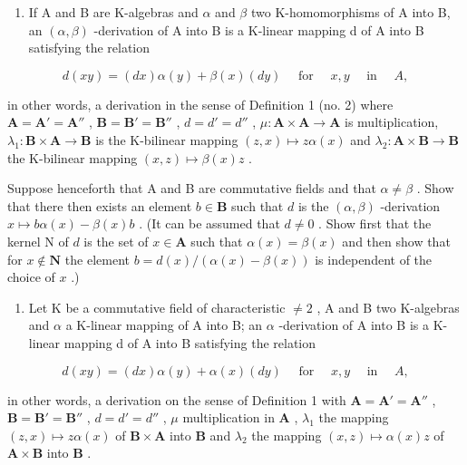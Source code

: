 \BourbakiExercisesSection

\begin{enumerate}
\def\labelenumi{\arabic{enumi}.}
\tightlist
\item
  If A and B are K-algebras and \(\alpha\) and \(\beta\) two K-homomorphisms of A into B, an \((\alpha, \beta)\) -derivation of A into B is a K-linear mapping d of A into B satisfying the relation
\end{enumerate}

\[
d (x y) = (d x) \alpha (y) + \beta (x) (d y) \quad \text { for } \quad x, y \quad \text { in } \quad A,
\]

in other words, a derivation in the sense of Definition 1 (no. 2) where \(\mathbf{A} = \mathbf{A}' = \mathbf{A}''\) , \(\mathbf{B} = \mathbf{B}' = \mathbf{B}''\) , \(d = d' = d''\) , \(\mu: \mathbf{A} \times \mathbf{A} \to \mathbf{A}\) is multiplication, \(\lambda_1: \mathbf{B} \times \mathbf{A} \to \mathbf{B}\) is the K-bilinear mapping \((z, x) \mapsto z\alpha(x)\) and \(\lambda_2: \mathbf{A} \times \mathbf{B} \to \mathbf{B}\) the K-bilinear mapping \((x, z) \mapsto \beta(x)z\) .

Suppose henceforth that A and B are commutative fields and that \(\alpha \neq \beta\) . Show that there then exists an element \(b \in \mathbf{B}\) such that \(d\) is the \((\alpha, \beta)\) -derivation \(x \mapsto b\alpha(x) - \beta(x)b\) . (It can be assumed that \(d \neq 0\) . Show first that the kernel N of \(d\) is the set of \(x \in \mathbf{A}\) such that \(\alpha(x) = \beta(x)\) and then show that for \(x \notin \mathbf{N}\) the element \(b = d(x)/( \alpha(x) - \beta(x))\) is independent of the choice of \(x\) .)

\begin{enumerate}
\def\labelenumi{\arabic{enumi}.}
\setcounter{enumi}{1}
\tightlist
\item
  Let K be a commutative field of characteristic \(\neq2\) , A and B two K-algebras and \(\alpha\) a K-linear mapping of A into B; an \(\alpha\) -derivation of A into B is a K-linear mapping d of A into B satisfying the relation
\end{enumerate}

\[
d (x y) = (d x) \alpha (y) + \alpha (x) (d y) \quad \text { for } \quad x, y \quad \text { in } \quad A,
\]

in other words, a derivation on the sense of Definition 1 with \(\mathbf{A} = \mathbf{A}' = \mathbf{A}''\) , \(\mathbf{B} = \mathbf{B}' = \mathbf{B}''\) , \(d = d' = d''\) , \(\mu\) multiplication in \(\mathbf{A}\) , \(\lambda_1\) the mapping \((z,x) \mapsto z\alpha(x)\) of \(\mathbf{B} \times \mathbf{A}\) into \(\mathbf{B}\) and \(\lambda_2\) the mapping \((x,z) \mapsto \alpha(x)z\) of \(\mathbf{A} \times \mathbf{B}\) into \(\mathbf{B}\) .

